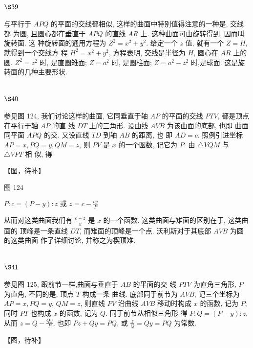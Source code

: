 \section{$\S 39$}

与平行于 $A P Q$ 的平面的交线都相似, 这样的曲面中特别值得注意的一种是, 交线都 为圆, 且圆心都在垂直于 $A P Q$ 的直线 $A R$ 上. 这种曲面可由旋转得到, 因而叫旋转面. 这 种旋转面的通用方程为 $Z^{2}=x^{2}+y^{2}$. 给定一个 $z$ 值, 就有一个 $Z=H$, 就得到一个交线方 程 $H^{2}=x^{2}+y^{2}$, 方程表明, 交线是半径为 $H$, 圆心在 $A R$ 上的圆. $Z^{2}=z^{2}$ 时, 是直圆雉面; $Z=a^{2}$ 时, 是圆柱面; $Z=a^{2}-z^{2}$ 时,是球面. 这是旋转面的几种主要形状.

\section{$\S 40$}

参见图 124, 我们讨论这样的曲面, 它同垂直于轴 $A P$ 的平面的交线 $P T V$, 都是顶点在平行于轴 $A P$ 的直 线 $D T$ 上的三角形. 设曲线 $A V B$ 为该曲面的底部, 也即 曲面同平面 $A P Q$ 的交. 又设直线 $T D$ 到轴 $A B$ 的距离, 也 即 $A D=c$. 照例引进坐标 $A P=x, P Q=y, Q M=z$, 则 $P V$ 是 $x$ 的一个函数, 记它为 $P$. 由 $\triangle V Q M$ 与 $\triangle V P T$ 相 似, 得


【图，待补】

图 124 

$P: c=(P-y): z$ 或 $z=c-\frac{c y}{P}$

从而对这类曲面我们有 $\frac{c-z}{y}$ 是 $x$ 的一个函数. 这类曲面与雉面的区别在于, 这类曲面的 顶峰是一条直线 $D T$, 而雉面的顶峰是一个点. 沃利斯对于其底部 $A V B$ 为圆的这类曲面 作了详细讨论, 并称之为楔顶雉.

\section{$\S 41$}

参见图 125, 跟前节一样,曲面与垂直于 $A B$ 的平面的交 线 $P T V$ 为直角三角形, $P$ 为直角, 不同的是, 顶点 $T$ 构成一条 曲线. 底部同于前节为 $A V B$, 记三个坐标为 $A P=x, P Q=y$, $Q M=z$, 则直线 $P V$ 沿曲线 $A V B$ 移动时构成 $x$ 的函数, 记为 $P$; 同时 $P T$ 也构成 $x$ 的函数, 记为 $Q$. 同于前节从相似三角形 得 $P: Q=(P-y): z$, 从而 $z=Q-\frac{Q y}{P}$, 也即 $P z+Q y=P Q$, 或 $\frac{z}{Q}=Q y=P Q$ 为常数.


【图，待补】

